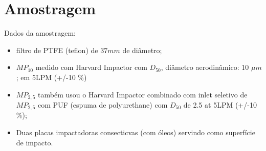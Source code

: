 \section{Amostragem}

Dados da amostragem:
\begin{itemize}
  \item filtro de PTFE (teflon) de $37mm$ de diâmetro;
  \item $MP_{10}$ medido com Harvard Impactor com $D_50$, diâmetro 
        aerodinâmico: 10 $\mu m$;
em 5LPM (+/-10 \%)
  \item $MP_{2,5}$ também usou o Harvard Impactor combinado com inlet 
         seletivo de $MP_{2,5}$ com PUF (espuma de polyurethane) com $D_50$ 
          de 2.5 at 5LPM (+/-10 \%);
  \item Duas placas impactadoras consecticvas (com óleos) servindo como 
        superfície de impacto.
\end{itemize}
